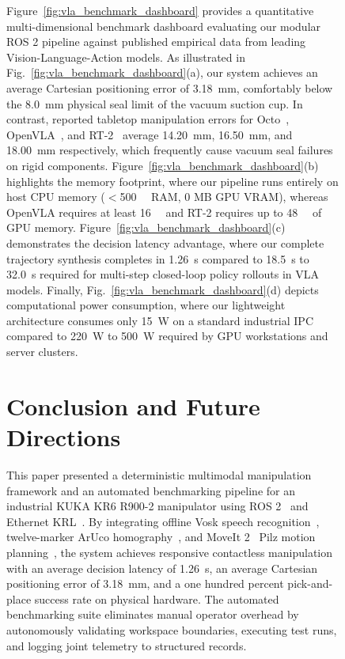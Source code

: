 \documentclass[runningheads]{llncs}
\begin{document}
\begin{figure}[tb]
Figure~\ref{fig:vla_benchmark_dashboard} provides a quantitative multi-dimensional benchmark dashboard evaluating our modular ROS 2 pipeline against published empirical data from leading Vision-Language-Action models. As illustrated in Fig.~\ref{fig:vla_benchmark_dashboard}(a), our system achieves an average Cartesian positioning error of \SI{3.18}{\milli\meter}, comfortably below the \SI{8.0}{\milli\meter} physical seal limit of the vacuum suction cup. In contrast, reported tabletop manipulation errors for Octo~\cite{octo2024}, OpenVLA~\cite{openvla2024}, and RT-2~\cite{rt2_2023} average \SI{14.20}{\milli\meter}, \SI{16.50}{\milli\meter}, and \SI{18.00}{\milli\meter} respectively, which frequently cause vacuum seal failures on rigid components. Figure~\ref{fig:vla_benchmark_dashboard}(b) highlights the memory footprint, where our pipeline runs entirely on host CPU memory ($<$\SI{500}{\mega\byte} RAM, 0 MB GPU VRAM), whereas OpenVLA requires at least \SI{16}{\giga\byte} and RT-2 requires up to \SI{48}{\giga\byte} of GPU memory. Figure~\ref{fig:vla_benchmark_dashboard}(c) demonstrates the decision latency advantage, where our complete trajectory synthesis completes in \SI{1.26}{\second} compared to \SI{18.5}{\second} to \SI{32.0}{\second} required for multi-step closed-loop policy rollouts in VLA models. Finally, Fig.~\ref{fig:vla_benchmark_dashboard}(d) depicts computational power consumption, where our lightweight architecture consumes only \SI{15}{\watt} on a standard industrial IPC compared to \SI{220}{\watt} to \SI{500}{\watt} required by GPU workstations and server clusters.

\section{Conclusion and Future Directions}
\label{sec:conclusion}

This paper presented a deterministic multimodal manipulation framework and an automated benchmarking pipeline for an industrial KUKA KR6 R900-2 manipulator using ROS 2~\cite{ros2_2022} and Ethernet KRL~\cite{kuka_eki2019}. By integrating offline Vosk speech recognition~\cite{vosk2020}, twelve-marker ArUco homography~\cite{aruco2014}, and MoveIt 2~\cite{moveit2014} Pilz motion planning~\cite{pilz_motion2021}, the system achieves responsive contactless manipulation with an average decision latency of \SI{1.26}{\second}, an average Cartesian positioning error of \SI{3.18}{\milli\meter}, and a one hundred percent pick-and-place success rate on physical hardware. The automated benchmarking suite eliminates manual operator overhead by autonomously validating workspace boundaries, executing test runs, and logging joint telemetry to structured records.


\end{figure}
\end{document}
